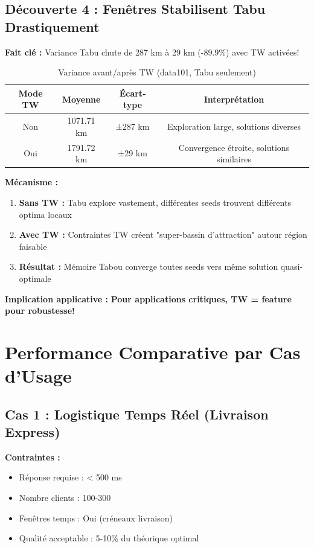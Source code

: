 \documentclass[12pt,a4paper,twoside]{report}
\begin{document}
\subsection{Découverte 4 : Fenêtres Stabilisent Tabu Drastiquement}

\textbf{Fait clé :} Variance Tabu chute de 287 km à 29 km (-89.9\%) avec TW activées!

\begin{table}[H]
    \centering
    \caption{Variance avant/après TW (data101, Tabu seulement)}
    \begin{tabular}{|c|c|c|c|}
        \hline
        \textbf{Mode TW} & \textbf{Moyenne} & \textbf{Écart-type} & \textbf{Interprétation}                   \\
        \hline
        Non              & 1071.71 km       & ±287 km             & Exploration large, solutions diverses     \\
        Oui              & 1791.72 km       & ±29 km              & Convergence étroite, solutions similaires \\
        \hline
    \end{tabular}
\end{table}

\textbf{Mécanisme :}
\begin{enumerate}
    \item \textbf{Sans TW :} Tabu explore vastement, différentes seeds trouvent différents optima locaux
    \item \textbf{Avec TW :} Contraintes TW créent "super-bassin d'attraction" autour région faisable
    \item \textbf{Résultat :} Mémoire Tabou converge toutes seeds vers même solution quasi-optimale
\end{enumerate}

\textbf{Implication applicative :} \textbf{Pour applications critiques, TW = feature pour robustesse!}

\section{Performance Comparative par Cas d'Usage}

\subsection{Cas 1 : Logistique Temps Réel (Livraison Express)}

\textbf{Contraintes :}
\begin{itemize}
    \item Réponse requise : < 500 ms
    \item Nombre clients : 100-300
    \item Fenêtres temps : Oui (créneaux livraison)
    \item Qualité acceptable : 5-10\% du théorique optimal
\end{itemize}
\end{document}
